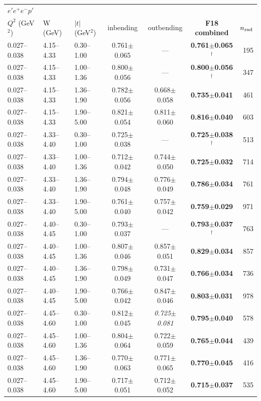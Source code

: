 \medskip

\begin{tabular}{lllcccr}\toprule
\multicolumn{7}{l}{$e'e^+e^-p'$}\\
$Q^2$ (GeV$^2$) & W (GeV) & $|t|$ (GeV$^2$) & inbending & outbending & \textbf{F18 combined} & $n_{\rm rad}$ \\\midrule
0.027--0.038 & 4.15--4.33 & 0.30--1.00 & 0.761$\pm$0.065 & --- & \textbf{0.761$\pm$0.065$^\dagger$} & 195 \\
0.027--0.038 & 4.15--4.33 & 1.00--1.36 & 0.800$\pm$0.056 & --- & \textbf{0.800$\pm$0.056$^\dagger$} & 347 \\
0.027--0.038 & 4.15--4.33 & 1.36--1.90 & 0.782$\pm$0.056 & 0.668$\pm$0.058 & \textbf{0.735$\pm$0.041} & 461 \\
0.027--0.038 & 4.15--4.33 & 1.90--5.00 & 0.821$\pm$0.054 & 0.811$\pm$0.060 & \textbf{0.816$\pm$0.040} & 603 \\
0.027--0.038 & 4.33--4.40 & 0.30--1.00 & 0.725$\pm$0.038 & --- & \textbf{0.725$\pm$0.038$^\dagger$} & 513 \\
0.027--0.038 & 4.33--4.40 & 1.00--1.36 & 0.712$\pm$0.042 & 0.744$\pm$0.050 & \textbf{0.725$\pm$0.032} & 714 \\
0.027--0.038 & 4.33--4.40 & 1.36--1.90 & 0.794$\pm$0.048 & 0.776$\pm$0.049 & \textbf{0.786$\pm$0.034} & 761 \\
0.027--0.038 & 4.33--4.40 & 1.90--5.00 & 0.761$\pm$0.040 & 0.757$\pm$0.042 & \textbf{0.759$\pm$0.029} & 971 \\
0.027--0.038 & 4.40--4.45 & 0.30--1.00 & 0.793$\pm$0.037 & --- & \textbf{0.793$\pm$0.037$^\dagger$} & 763 \\
0.027--0.038 & 4.40--4.45 & 1.00--1.36 & 0.807$\pm$0.046 & 0.857$\pm$0.051 & \textbf{0.829$\pm$0.034} & 857 \\
0.027--0.038 & 4.40--4.45 & 1.36--1.90 & 0.798$\pm$0.049 & 0.731$\pm$0.047 & \textbf{0.766$\pm$0.034} & 736 \\
0.027--0.038 & 4.40--4.45 & 1.90--5.00 & 0.766$\pm$0.042 & 0.847$\pm$0.046 & \textbf{0.803$\pm$0.031} & 978 \\
0.027--0.038 & 4.45--4.60 & 0.30--1.00 & 0.812$\pm$0.045 & \textit{0.725$\pm$0.081} & \textbf{0.795$\pm$0.040} & 578 \\
0.027--0.038 & 4.45--4.60 & 1.00--1.36 & 0.804$\pm$0.064 & 0.722$\pm$0.059 & \textbf{0.765$\pm$0.044} & 439 \\
0.027--0.038 & 4.45--4.60 & 1.36--1.90 & 0.770$\pm$0.063 & 0.771$\pm$0.065 & \textbf{0.770$\pm$0.045} & 416 \\
0.027--0.038 & 4.45--4.60 & 1.90--5.00 & 0.717$\pm$0.051 & 0.712$\pm$0.052 & \textbf{0.715$\pm$0.037} & 535 \\
\bottomrule\end{tabular}

